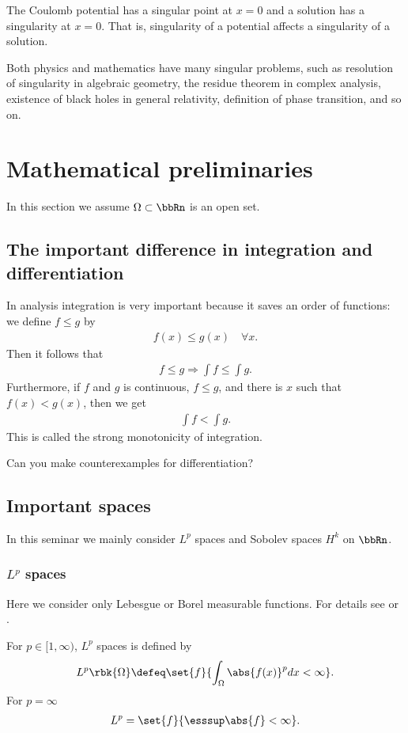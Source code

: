 \documentclass[openany, a4paper, oneside]{jsbook}
\begin{document}
The Coulomb potential has a singular point at $x = 0$ and a solution has a singularity at $x = 0$.
That is, singularity of a potential affects a singularity of a solution.

Both physics and mathematics have many singular problems,
such as resolution of singularity in algebraic geometry,
the residue theorem in complex analysis,
existence of black holes in general relativity, definition of phase transition, and so on.
\section{Mathematical preliminaries}

In this section we assume $\Omega \subset \bbRn$ is an open set.
\subsection{The important difference in integration and differentiation}

In analysis integration is very important because it saves an order of functions:
we define $f \leq g$ by
\begin{align}
 f (x) \leq g (x) \quad \forall x.
\end{align}
Then it follows that
\begin{align}
 f \leq g
 \Rightarrow
 \int f \leq \int g.
\end{align}
Furthermore, if $f$ and $g$ is continuous, $f \leq g$, and there is $x$ such that $f (x) < g (x)$, then we get
\begin{align}
 \int f < \int g.
\end{align}
This is called the strong monotonicity of integration.

Can you make counterexamples for differentiation?
\subsection{Important spaces}

In this seminar we mainly consider $L^p$ spaces and Sobolev spaces $H^k$ on $\bbRn$.
\subsubsection{$L^p$ spaces}

Here we consider only Lebesgue or Borel measurable functions.
For details see \cite{SeizoIto1} or \cite{LiebLoss1}.

For $p \in [1, \infty)$, $L^p$ spaces is defined by
\begin{align}
 L^p \rbk{\Omega}
 \defeq
 \set{f}{\int_{\Omega} \abs{f (x)}^p dx < \infty}.
\end{align}
For $p = \infty$
\begin{align}
 L^p
 =
 \set{f}{\esssup \abs{f} < \infty}.
\end{align}
\end{document}
